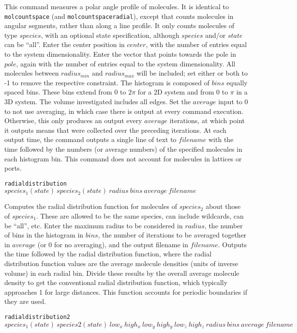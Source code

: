 \documentclass {scrbook}
\newcommand {\ttt} {\texttt}
\begin{document}
\begin{description}
This command measures a polar angle profile of molecules. It is identical to \ttt{molcountspace} (and \ttt{molcountspaceradial}), except that counts molecules in angular segments, rather than along a line profile. It only counts molecules of type $species$, with an optional state specification, although $species$ and/or $state$ can be ``all''. Enter the center position in $center$, with the number of entries equal to the system dimensionality. Enter the vector that points towards the pole in $pole$, again with the number of entries equal to the system dimensionality. All molecules between $radius_{min}$ and $radius_{max}$ will be included; set either or both to -1 to remove the respective constraint. The histogram is composed of $bins$ equally spaced bins. These bins extend from 0 to $2\pi$ for a 2D system and from 0 to $\pi$ in a 3D system. The volume investigated includes all edges. Set the $average$ input to 0 to not use averaging, in which case there is output at every command execution. Otherwise, this only produces an output every $average$ iterations, at which point it outputs means that were collected over the preceding iterations. At each output time, the command outputs a single line of text to $filename$ with the time followed by the numbers (or average numbers) of the specified molecules in each histogram bin. This command does not account for molecules in lattices or ports.

\item{\ttt{radialdistribution} $species_1(state)\ species_2(state)\ radius\ bins\ average\ filename$}

Computes the radial distribution function for molecules of $species_2$ about those of $species_1$. These are allowed to be the same species, can include wildcards, can be ``all'', etc. Enter the maximum radius to be considered in $radius$, the number of bins in the histogram in $bins$, the number of iterations to be averaged together in $average$ (or 0 for no averaging), and the output filename in $filename$. Outputs the time followed by the radial distribution function, where the radial distribution function values are the average molecule densities (units of inverse volume) in each radial bin. Divide these results by the overall average molecule density to get the conventional radial distribution function, which typically approaches 1 for large distances. This function accounts for periodic boundaries if they are used.

\item{\ttt{radialdistribution2} $species_1(state)\ species2(state)\ low_x\ high_x\ low_y\ high_y\ low_z\ high_z\ radius\ bins\ average\ filename$}


\end{description}
\end{document}
